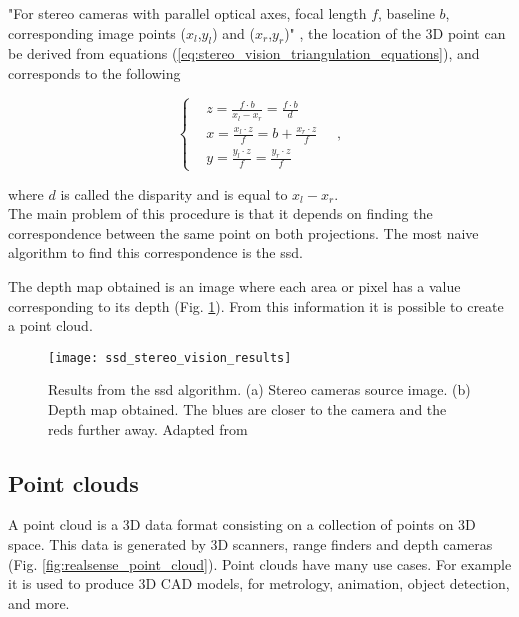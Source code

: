 "For stereo cameras with parallel optical axes, focal length $f$, baseline $b$, corresponding image points ($x_l$,$y_l$) and ($x_r$,$y_r$)" \cite{Rao2009_stereo_3d_vision}, the location of the 3D point can be derived from equations (\ref{eq:stereo_vision_triangulation_equations}), and corresponds to the following

\begin{equation}
    \left\{
    \begin{aligned}
    & z = \frac{f \cdot b}{x_l - x_r} = \frac{f \cdot b}{d} \\
    & x = \frac{x_l \cdot z}{f} = b + \frac{x_r \cdot z}{f} \\
    & y = \frac{y_l \cdot z}{f} = \frac{y_r \cdot z}{f}
    \end{aligned}
    \right.
    \quad,
\end{equation}

where $d$ is called the disparity and is equal to $x_l - x_r$.\\

The main problem of this procedure is that it depends on finding the correspondence between the same point on both projections. The most naive algorithm to find this correspondence is the \gls{ssd}.

The depth map obtained is an image where each area or pixel has a value corresponding to its depth (Fig. \ref{fig:ssd_stereo_vision_results}). From this information it is possible to create a point cloud.

\begin{figure}[htbp]
	\centering
	\texttt{[image: ssd\_stereo\_vision\_results]}
	\caption{Results from the \gls{ssd} algorithm. (a) Stereo cameras source image. (b) Depth map obtained. The blues are closer to the camera and the reds further away. Adapted from \cite{IntelRealSense_basics_depth_vision}}
	\label{fig:ssd_stereo_vision_results}
\end{figure}


\subsection{Point clouds}
\label{subsec:point_clouds}

A point cloud is a 3D data format consisting on a collection of points on 3D space. This data is generated by 3D scanners, range finders and depth cameras (Fig. \ref{fig:realsense_point_cloud}). Point clouds have many use cases. For example it is used to produce 3D CAD models, for metrology, animation, object detection, and more.

